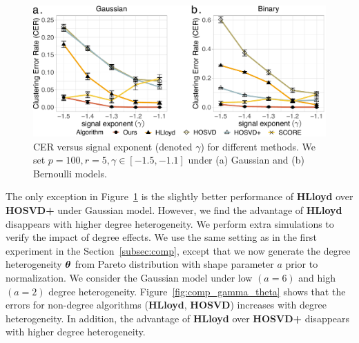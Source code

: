 \documentclass[lettersize,onecolumn,journal]{IEEEtran}
\theoremstyle{definition}
\theoremstyle{definition}
\begin{document}
\begin{figure}[h!]
    \centering
    \includegraphics[width=.8\columnwidth]{comp_gamma_anno3.pdf}
    \caption{CER versus signal exponent (denoted $\gamma$) for different methods. We set $p = 100, r = 5, \gamma \in [-1.5, -1.1]$ under (a) Gaussian and (b) Bernoulli models.}
    \label{fig:comp_gamma}
\end{figure}


The only exception in Figure~\ref{fig:comp_gamma} is the slightly better performance of \textbf{\small HLloyd} over \textbf{\small HOSVD+} under Gaussian model. However, we find the advantage of \textbf{\small HLloyd} disappears with higher degree heterogeneity. We perform extra simulations to verify the impact of degree effects. We use the same setting as in the first experiment in the Section~\ref{subsec:comp}, except that we now generate the degree heterogeneity $\boldsymbol{\theta}$ from Pareto distribution with shape parameter $a$ prior to normalization. We consider the Gaussian model under low $(a = 6)$ and high $(a = 2)$ degree heterogeneity. Figure~\ref{fig:comp_gamma_theta} shows that the errors for non-degree algorithms (\textbf{\small HLloyd}, \textbf{\small HOSVD}) increases with degree heterogeneity. In addition, the advantage of \textbf{\small HLloyd} over \textbf{\small HOSVD+} disappears with higher degree heterogeneity. 


\end{document}
